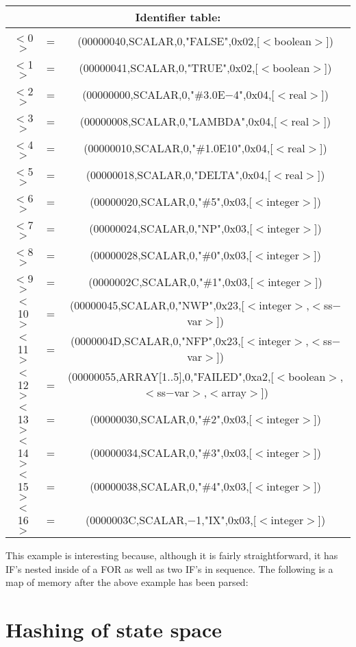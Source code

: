 \begin{center}\begin{tabular}{|c|c|c|}
\hline
\multicolumn{3}{|c|}{Identifier table:} \\
\hline
   $<$0$>$ & = & (00000040,SCALAR,0,"FALSE",0x02,[$<$boolean$>$]) \\
   $<$1$>$ & = & (00000041,SCALAR,0,"TRUE",0x02,[$<$boolean$>$]) \\
   $<$2$>$ & = & (00000000,SCALAR,0,"\#3.0E$-$4",0x04,[$<$real$>$]) \\
   $<$3$>$ & = & (00000008,SCALAR,0,"LAMBDA",0x04,[$<$real$>$]) \\
   $<$4$>$ & = & (00000010,SCALAR,0,"\#1.0E10",0x04,[$<$real$>$]) \\
   $<$5$>$ & = & (00000018,SCALAR,0,"DELTA",0x04,[$<$real$>$]) \\
   $<$6$>$ & = & (00000020,SCALAR,0,"\#5",0x03,[$<$integer$>$]) \\
   $<$7$>$ & = & (00000024,SCALAR,0,"NP",0x03,[$<$integer$>$]) \\
   $<$8$>$ & = & (00000028,SCALAR,0,"\#0",0x03,[$<$integer$>$]) \\
   $<$9$>$ & = & (0000002C,SCALAR,0,"\#1",0x03,[$<$integer$>$]) \\
   $<$10$>$ & = & (00000045,SCALAR,0,"NWP",0x23,[$<$integer$>$,$<$ss$-$var$>$]) \\
   $<$11$>$ & = & (0000004D,SCALAR,0,"NFP",0x23,[$<$integer$>$,$<$ss$-$var$>$]) \\
   $<$12$>$ & = & (00000055,ARRAY[1..5],0,"FAILED",0xa2,[$<$boolean$>$,$<$ss$-$var$>$,$<$array$>$]) \\
   $<$13$>$ & = & (00000030,SCALAR,0,"\#2",0x03,[$<$integer$>$]) \\
   $<$14$>$ & = & (00000034,SCALAR,0,"\#3",0x03,[$<$integer$>$]) \\
   $<$15$>$ & = & (00000038,SCALAR,0,"\#4",0x03,[$<$integer$>$]) \\
   $<$16$>$ & = & (0000003C,SCALAR,$-$1,"IX",0x03,[$<$integer$>$]) \\
\hline
\end{tabular}\end{center}

This example is interesting because, although it is fairly straightforward,
it has IF's nested inside of a FOR as well as two IF's in sequence.  The
following is a map of memory after the above example has been parsed:


\section{Hashing of state space}
\label{chap:hash}

